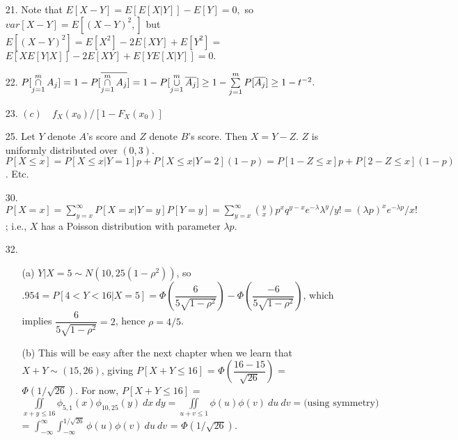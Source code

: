 \begin{enumerate}
	\item[21.] Note that $E[X-Y] = E[E[X\vert Y]] - E[Y] = 0,$ so \\ $var[X-Y] = E[(X-Y)^2,]$ but $E[(X-Y)^2] = E[X^2] - 2E[XY] + E[Y^2] = $ \\ 
	$E[XE[Y\vert X]] - 2E[XY] + E[YE[X\vert Y]] = 0.$
	
	\item[22.] $P[\operatorname*{\cap}\limits_{j=1}^mA_j] = 1 - P[\overline{\operatorname*{\cap}\limits_{j=1}^mA_j}] = 1 - P[\operatorname*{\cup}\limits_{j=1}^m\overline{A_j}] \ge 1 - \sum\limits_{j=1}^m P[\overline{A_j}] \ge 1 - t^{-2}.$
	
	\item[23.] $(c)\quad f_X(x_0)/[1-F_X(x_0)]$
	
	\item[25.] Let $Y$ denote $A$'s score and $Z$ denote $B$'s score.  Then $X = Y -Z$.  $Z$ is uniformly distributed over $(0,3)$. \\
	$P[X\!\le\!x] = P[X\!\le\!x \vert Y\!=\!1]p + P[X\!\le\! x\vert Y\!=\!2](1-p) = P[1-Z\le x]p + P[2-Z\le x](1-p)$. Etc.
	
	\item[30.] $\displaystyle P[X=x] = \sum_{y=x}^{\infty}P[X=x\vert Y=y]P[Y=y] =  \sum_{y=x}^{\infty}{y \choose x}p^xq^{y-x}e^{-\lambda}\lambda^y/y! = (\lambda p)^xe^{-\lambda p}/x!$; i.e., $X$ has a Poisson distribution with parameter $\lambda p$.
	
	\item[32.] \begin{itemize}
		\item[(a)] $Y\vert X\!=\!5\sim N(10,25(1-\rho^2))$, so $.954 = P[4\!<\!Y\!<\!16\vert X\!=\!5]\!=\!\Phi\!\left(\dfrac{6}{5\sqrt{1-\rho^2}}\right) \!-\! \Phi\!\left(\dfrac{-6}{5\sqrt{1-\rho^2}}\right)$, which implies $\dfrac{6}{5\sqrt{1-\rho^2}} = 2$, hence $\rho = 4/5$.
 		\item[(b)] This will be easy after the next chapter when we	learn that $X + Y \sim (15,26)$, giving $P[X+Y\le 16]$ = $\Phi\left(\dfrac{16-15}{\sqrt{26}}\right)$ = $\Phi\left(1/\sqrt{26}\right)$.  For now, $\displaystyle P[X+Y\le 16]$ = \newline $\displaystyle \iint\limits_{x+y\le 16}\phi_{5,1}(x)\phi_{10,25}(y)\ dx\ dy =  \iint\limits_{u+v\le 1}\phi(u)\phi(v)\ du\ dv = \mbox{(using\ symmetry)}$ = \newline $\displaystyle\int_{-\infty}^{\infty}\int_{-\infty}^{1/\sqrt{26}} \phi(u)\phi(v)\ du\ dv$ = $\Phi\left(1/\sqrt{26}\right)$.	
	\end{itemize} 
	

\end{enumerate}

